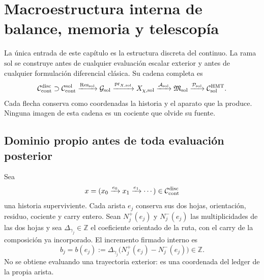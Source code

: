 \iffalse

\chapter{Macroestructura interna de balance, memoria y telescopía}
\label{chap:pdfv2-sol-interna}

\begin{statusbox}
La única entrada de este capítulo es la estructura discreta del continuo.
La rama \(\mathrm{sol}\) se construye antes de cualquier evaluación escalar
exterior y antes de cualquier formulación diferencial clásica.  Su cadena
completa es
\[
 \mathcal C_{\rm cont}^{\rm disc}
 \supset\mathcal C_{\rm cont}^{\rm sol}
 \xrightarrow{\operatorname{Res}_{\rm sol}}
 \mathcal G_{\rm sol}
 \xrightarrow{\operatorname{pr}_{X,{\rm sol}}}
 X_{\chi,{\rm sol}}
 \xrightarrow{\mathcal A_{\rm sol}}
 \mathfrak M_{\rm sol}
 \xrightarrow{\mathcal P_{\rm sol}}
 \mathcal C_{\rm sol}^{\rm HMT}.
\]
Cada flecha conserva como coordenadas la historia y el aparato que la
produce.  Ninguna imagen de esta cadena es un cociente que olvide su fuente.
\end{statusbox}

\section{Dominio propio antes de toda evaluación posterior}
\label{sec:pdfv2-sol-dominio}

Sea
\[
 x=(x_0\xrightarrow{e_0}x_1\xrightarrow{e_1}\cdots)
 \in\mathcal C_{\rm cont}^{\rm disc}
\]
una historia superviviente.  Cada arista \(e_j\) conserva sus dos hojas,
orientación, residuo, cociente y carry entero.  Sean
\(N_j^+(e_j)\) y \(N_j^-(e_j)\) las multiplicidades de las dos hojas y sea
\(\Delta_{\gamma_j}\in\mathbb Z\) el coeficiente orientado de la ruta, con el
carry de la composición ya incorporado.  El incremento firmado interno es
\begin{equation}\label{eq:pdfv2-sol-b}
 b_j=b(e_j):=
 \Delta_{\gamma_j}\bigl(N_j^+(e_j)-N_j^-(e_j)\bigr)\in\mathbb Z.
\end{equation}
No se obtiene evaluando una trayectoria exterior: es una coordenada del
ledger de la propia arista.

